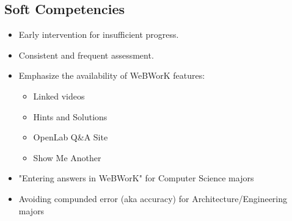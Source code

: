 \documentclass{ximera}
\begin{document}
\subsection{Soft Competencies}

\begin{itemize}
 \item Early intervention for insufficient progress.
 \item Consistent and frequent assessment.
 \item Emphasize the availability of WeBWorK features:
 \begin{itemize}
  \item Linked videos
  \item Hints and Solutions
  \item OpenLab Q\&A Site
  \item Show Me Another
 \end{itemize}
 \item "Entering answers in WeBWorK" for Computer Science majors
 \item Avoiding compunded error (aka accuracy) for Architecture/Engineering majors
\end{itemize}
\end{document}
